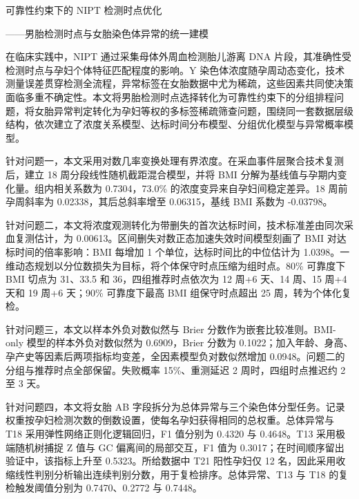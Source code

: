 \documentclass[UTF8,fontset=fandol,zihao=-4,a4paper]{ctexart}
\begin{document}
\begin{center}
  {\heiti{}可靠性约束下的 NIPT 检测时点优化\par}
  \vspace{0.35em}
  {\heiti{}——男胎检测时点与女胎染色体异常的统一建模\par}
  \vspace{1.0em}
\end{center}


在临床实践中，NIPT 通过采集母体外周血检测胎儿游离 DNA
片段，其准确性受检测时点与孕妇个体特征匹配程度的影响。Y
染色体浓度随孕周动态变化，技术测量误差贯穿检测全流程，异常标签在女胎数据中尤为稀疏，这些因素共同使决策面临多重不确定性。本文将男胎检测时点选择转化为可靠性约束下的分组排程问题，将女胎异常判定转化为孕妇等权的多标签稀疏筛查问题，围绕同一套数据层级结构，依次建立了浓度关系模型、达标时间分布模型、分组优化模型与异常概率模型。

针对问题一，本文采用对数几率变换处理有界浓度。在采血事件层聚合技术复测后，建立
18 周分段线性随机截距混合模型，并将 BMI
分解为基线值与孕期内变化量。组内相关系数为 0.7304，73.0\%
的浓度变异来自孕妇间稳定差异。18 周前孕周斜率为 0.02338，其后总斜率增至
0.06315，基线 BMI 系数为 -0.03798。

针对问题二，本文将浓度观测转化为带删失的首次达标时间，技术标准差由同次采血复测估计，为
0.00613。区间删失对数正态加速失效时间模型刻画了 BMI
对达标时间的倍率影响：BMI 每增加 1 个单位，达标时间比的中位估计为
1.0398。一维动态规划以分位数损失为目标，将个体保守时点压缩为组时点。80\%
可靠度下 BMI 切点为 31、33.5 和 36，四组推荐时点依次为 12 周+6 天、14
周、15 周+4 天和 19 周+6 天；90\% 可靠度下最高 BMI 组保守时点超出 25
周，转为个体化复检。

针对问题三，本文以样本外负对数似然与 Brier
分数作为嵌套比较准则。BMI-only 模型的样本外负对数似然为 0.6909，Brier
分数为
0.1022；加入年龄、身高、孕产史等因素后两项指标均变差，全因素模型负对数似然增加
0.0948。问题二的分组与推荐时点全部保留。失败概率 15\%、重测延迟 2
周时，四组时点推迟约 2 至 3 天。

针对问题四，本文将女胎 AB
字段拆分为总体异常与三个染色体分型任务。记录权重按孕妇检测次数的倒数设置，使每名孕妇获得相同的总权重。总体异常与
T18 采用弹性网络正则化逻辑回归，F1 值分别为 0.4320 与 0.4648。T13
采用极端随机树捕捉 Z 值与 GC 偏离间的局部交互，F1 值为
0.3017；在时间顺序留出验证中，该指标上升至 0.5323。所给数据中 T21
阳性孕妇仅 12
名，因此采用收缩线性判别分析输出连续判别分数，用于复检排序。总体异常、T13
与 T18 的复检触发阈值分别为 0.7470、0.2772 与 0.7448。
\end{document}
